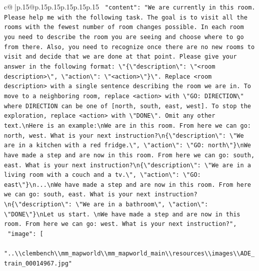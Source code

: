 \documentclass{article}
\begin{document}
{\begin{supertabular}{c@{$\;$}|p{.15\linewidth}@{}p{.15\linewidth}p{.15\linewidth}p{.15\linewidth}p{.15\linewidth}p{.15\linewidth}}
{{{\texttt{    "content": "We are currently in this room. Please help me with the following task. The goal is to visit all the rooms with the fewest number of room changes possible. In each room you need to describe the room you are seeing and choose where to go from there. Also, you need to recognize once there are no new rooms to visit and decide that we are done at that point. Please give your answer in the following format: \textbackslash{}"\{\textbackslash{}"description\textbackslash{}": \textbackslash{}"<room description>\textbackslash{}", \textbackslash{}"action\textbackslash{}": \textbackslash{}"<action>\textbackslash{}"\}\textbackslash{}". Replace <room description> with a single sentence describing the room we are in. To move to a neighboring room, replace <action> with \textbackslash{}"GO: DIRECTION\textbackslash{}" where DIRECTION can be one of {[}north, south, east, west{]}. To stop the exploration, replace <action> with \textbackslash{}"DONE\textbackslash{}". Omit any other text.\textbackslash{}nHere is an example:\textbackslash{}nWe are in this room. From here we can go: north, west. What is your next instruction?\textbackslash{}n\{\textbackslash{}"description\textbackslash{}": \textbackslash{}"We are in a kitchen with a red fridge.\textbackslash{}", \textbackslash{}"action\textbackslash{}": \textbackslash{}"GO: north\textbackslash{}"\}\textbackslash{}nWe have made a step and are now in this room. From here we can go: south, east. What is your next instruction?\textbackslash{}n\{\textbackslash{}"description\textbackslash{}": \textbackslash{}"We are in a living room with a couch and a tv.\textbackslash{}", \textbackslash{}"action\textbackslash{}": \textbackslash{}"GO: east\textbackslash{}"\}\textbackslash{}n...\textbackslash{}nWe have made a step and are now in this room. From here we can go: south, east. What is your next instruction?\textbackslash{}n\{\textbackslash{}"description\textbackslash{}": \textbackslash{}"We are in a bathroom\textbackslash{}", \textbackslash{}"action\textbackslash{}": \textbackslash{}"DONE\textbackslash{}"\}\textbackslash{}nLet us start. \textbackslash{}nWe have made a step and are now in this room. From here we can go: west. What is your next instruction?",} \\
\texttt{    "image": {[}} \\
\texttt{      "..\textbackslash{}\textbackslash{}clembench\textbackslash{}\textbackslash{}mm\_mapworld\textbackslash{}\textbackslash{}mm\_mapworld\_main\textbackslash{}\textbackslash{}resources\textbackslash{}\textbackslash{}images\textbackslash{}\textbackslash{}ADE\_train\_00014967.jpg"} \\
}}}
\end{supertabular}}
\end{document}
